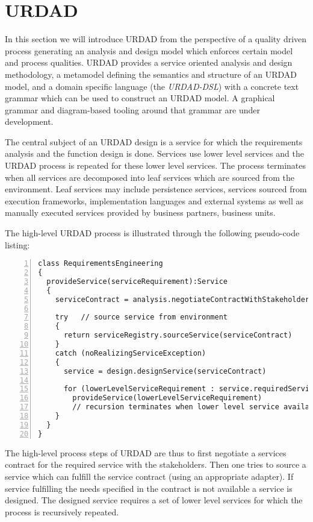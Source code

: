 \section{URDAD}
\label{sec:urdad}

In this section we will introduce URDAD from the perspective of a quality driven process generating an analysis and design model which enforces certain model and process qualities.  URDAD\cite{solms_generating_2009} provides a service oriented analysis and design methodology, a metamodel defining the semantics and structure of an URDAD model, and a domain specific language (the \emph{URDAD-DSL}) with a concrete text grammar which can be used to construct an URDAD model. A graphical grammar and diagram-based tooling around that grammar are under development. 

The central subject of an URDAD design is a service for which the requirements analysis and the function design is done. Services use lower level services and the URDAD process is repeated for these lower level services. The process terminates when all services are decomposed into leaf services which are sourced from the environment. Leaf services may include persistence services, services sourced from execution frameworks, implementation languages and external systems as well as manually executed services provided by business partners, business units.

The high-level URDAD process is illustrated through the following pseudo-code listing:

\lstset{language=pseudoCode,caption=The high-level algorithm of the URDAD process.,label=urdadHighLevel}
\begin{lstlisting}[numbers=left,escapechar=|]
class RequirementsEngineering
{
  provideService(serviceRequirement):Service
  {
    serviceContract = analysis.negotiateContractWithStakeholders(serviceRequirement)
 
    try   // source service from environment
    {
      return serviceRegistry.sourceService(serviceContract)
    }
    catch (noRealizingServiceException)
    {
      service = design.designService(serviceContract)

      for (lowerLevelServiceRequirement : service.requiredServices)
        provideService(lowerLevelServiceRequirement)
		// recursion terminates when lower level service available from environment
    }
  }
}
\end{lstlisting}

The high-level process steps of URDAD are thus to first negotiate a services contract for the required service with the stakeholders. Then one tries to source a service which can fulfill the service contract (using an appropriate adapter). If service fulfilling the needs specified in the contract is not available a service is designed. The designed service requires a set of lower level services for which the process is recursively repeated.

